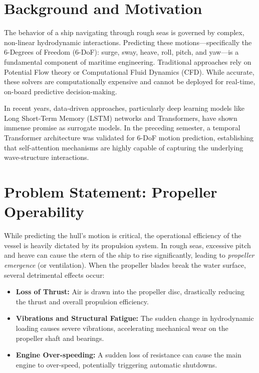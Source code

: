 \section{Background and Motivation}
The behavior of a ship navigating through rough seas is governed by complex, non-linear hydrodynamic interactions. Predicting these motions—specifically the 6-Degrees of Freedom (6-DoF): surge, sway, heave, roll, pitch, and yaw—is a fundamental component of maritime engineering. Traditional approaches rely on Potential Flow theory or Computational Fluid Dynamics (CFD). While accurate, these solvers are computationally expensive and cannot be deployed for real-time, on-board predictive decision-making. 

In recent years, data-driven approaches, particularly deep learning models like Long Short-Term Memory (LSTM) networks and Transformers, have shown immense promise as surrogate models. In the preceding semester, a temporal Transformer architecture was validated for 6-DoF motion prediction, establishing that self-attention mechanisms are highly capable of capturing the underlying wave-structure interactions.

\section{Problem Statement: Propeller Operability}
While predicting the hull's motion is critical, the operational efficiency of the vessel is heavily dictated by its propulsion system. In rough seas, excessive pitch and heave can cause the stern of the ship to rise significantly, leading to \textit{propeller emergence} (or ventilation). When the propeller blades break the water surface, several detrimental effects occur:
\begin{itemize}
    \item \textbf{Loss of Thrust:} Air is drawn into the propeller disc, drastically reducing the thrust and overall propulsion efficiency.
    \item \textbf{Vibrations and Structural Fatigue:} The sudden change in hydrodynamic loading causes severe vibrations, accelerating mechanical wear on the propeller shaft and bearings.
    \item \textbf{Engine Over-speeding:} A sudden loss of resistance can cause the main engine to over-speed, potentially triggering automatic shutdowns.
\end{itemize}

